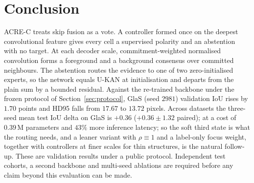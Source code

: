\section{Conclusion}
\label{sec:conclusion}

ACRE-C treats skip fusion as a vote. A controller formed once on the deepest convolutional feature gives every cell a supervised polarity and an abstention with no target. At each decoder scale, commitment-weighted normalised convolution forms a foreground and a background consensus over committed neighbours. The abstention routes the evidence to one of two zero-initialised experts, so the network equals U-KAN at initialisation and departs from the plain sum by a bounded residual. Against the re-trained backbone under the frozen protocol of Section~\ref{sec:protocol}, GlaS (seed $2981$) validation IoU rises by $1.70$ points and HD95 falls from $17.67$ to $13.72$ pixels. Across datasets the three-seed mean test IoU delta on GlaS is $+0.36$ ($+0.36\pm1.32$ paired);  at a cost of $0.39$\,M parameters and $43\%$ more inference latency;  so the soft third state is what the routing needs, and a leaner variant with $\rho\equiv1$ and a label-only focus weight, together with controllers at finer scales for thin structures, is the natural follow-up. These are validation results under a public protocol. Independent test cohorts, a second backbone and multi-seed ablations are required before any claim beyond this evaluation can be made.
